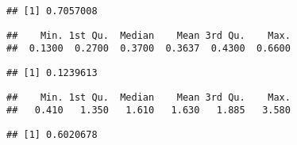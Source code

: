 \documentclass[
]{article}
\newenvironment{Shaded}{\begin{snugshade}}{\end{snugshade}}
\newcommand{\DataTypeTok}[1]{\textcolor[rgb]{0.13,0.29,0.53}{#1}}
\newcommand{\KeywordTok}[1]{\textcolor[rgb]{0.13,0.29,0.53}{\textbf{#1}}}
\newcommand{\NormalTok}[1]{#1}
\newcommand{\OperatorTok}[1]{\textcolor[rgb]{0.81,0.36,0.00}{\textbf{#1}}}
\newcommand{\StringTok}[1]{\textcolor[rgb]{0.31,0.60,0.02}{#1}}
\begin{document}
\begin{verbatim}
## [1] 0.7057008
\end{verbatim}

\begin{Shaded}
\end{Shaded}

\begin{verbatim}
##    Min. 1st Qu.  Median    Mean 3rd Qu.    Max. 
##  0.1300  0.2700  0.3700  0.3637  0.4300  0.6600
\end{verbatim}

\begin{Shaded}
\end{Shaded}

\begin{verbatim}
## [1] 0.1239613
\end{verbatim}

\begin{Shaded}
\end{Shaded}

\begin{verbatim}
##    Min. 1st Qu.  Median    Mean 3rd Qu.    Max. 
##   0.410   1.350   1.610   1.630   1.885   3.580
\end{verbatim}

\begin{Shaded}
\end{Shaded}

\begin{verbatim}
## [1] 0.6020678
\end{verbatim}

\begin{Shaded}
\end{Shaded}
\end{document}
